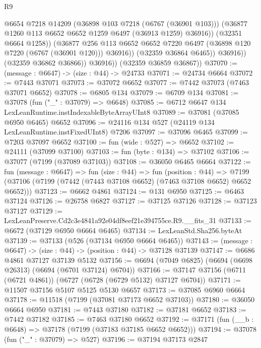 \begin{lexlean}{R9}
\begin{coremodule}
                        @6654
                        @7218
                        @14209
                        (@36898 @103 @7218 (@6767 (@36901 @103)))
                        (@36877 @1260 @113 @6652 @6652 @1259 @6497 (@36913 @1259) @36916))
                      (@32351 @6664 @1258))
                    (@36877
                      @256
                      @113
                      @6652
                      @6652
                      @7220
                      @6497
                      (@36898 @120 @7220 (@6767 (@36901 @120)))
                      @36916))
                  (@32359 @36864 @6465))
                @36916))
            (@32359 @36862 @36866))
          @36916))
      (@32359 @36859 @36867))
@37070 := (message : @6647) -> (size : @44) -> @24733
@37071 := @24734 @6664
@37072 := @7443 @37071
@37073 := @37072 @6652
@37077 := @7442 @37073 (@7463 @37071 @6652)
@37078 := @6805 @134
@37079 := @6709 @134
@37081 := @37078 (fun ("_" : @37079) => @6648)
@37085 := @6712 @6647 @134 LexLeanRuntime.instIndexableByteArrayUInt8
@37089 := @37081 (@37085 @6950 @6465) @6652
@37096 := @24116 @134 @527 (@24119 @134 LexLeanRuntime.instFixedUInt8) @7206
@37097 := @37096 @6465
@37099 := @7203 @37097 @6652
@37100 := fun (wide : @527) => @6652
@37102 := @24111 (@37099 @37100)
@37103 := fun (byte : @134) => @37102
@37106 := @37077 (@7199 (@37089 @37103))
@37108 := @36050 @6465 @6664
@37122 := fun (message : @6647) =>
  fun (size : @44) =>
  fun (position : @44) =>
  @7199 (@37106 (@7199 (@7442 (@7443 @37108 @6652) (@7463 @37108 @6652) @6652 @6652)))
@37123 := @6662 @4861
@37124 := @131 @6950
@37125 := @6463 @37124
@37126 := @26758 @6827
@37127 := @37125 @37126
@37128 := @37123 @37127
@37129 := LexLeanPreserve.Cd2c3e4841a92e04df8eef21e394755ce.R9.__fits_31
@37133 := @6672 (@37129 @6950 @6664 @6465)
@37134 := LexLeanStd.Sha256.byteAt
@37139 := @37133 (@526 (@37134 @6950 @6664 @6465))
@37143 := (message : @6647) -> (size : @44) -> (position : @44) -> @37128 @37139
@37147 := @6686 @4861 @37127 @37139 @5132
@37156 := @6694 (@7049 @6825) (@6694 (@6698 @26313) (@6694 (@6701 @37124) @6704))
@37166 := @37147 @37156 (@6711 (@6721 @4861)) (@6727 (@6728 (@6729 @5132) @37127 @6704))
@37171 := @11507 @37156 @5107 @5125 @5130 @6657
@37173 := @37085 @6960 @6664
@37178 := @11518 (@7199 (@37081 @37173 @6652 @37103))
@37180 := @36050 @6664 @6950
@37181 := @7443 @37180
@37182 := @37181 @6652
@37183 := @7442 @37182
@37185 := @7463 @37180 @6652
@37192 := @37171 (fun (__b : @6648) => @37178 (@7199 (@37183 @37185 @6652 @6652)))
@37194 := @37078 (fun ("_" : @37079) => @527)
@37196 := @37194 @37173 @2847

\end{coremodule}
\end{lexlean}
